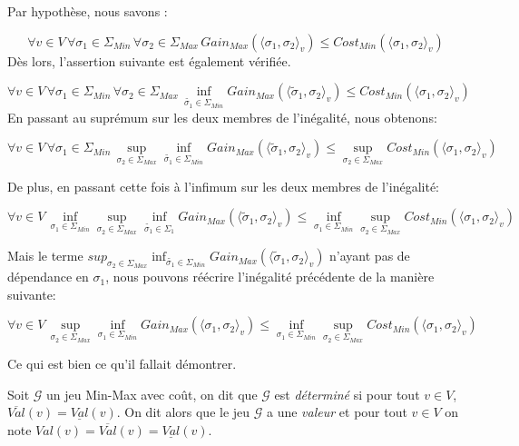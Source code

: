 \begin{demonstration}
	Par hypothèse, nous savons : 
	
	$$ \forall v \in V \, \forall \sigma_{1} \in \Sigma_{Min} \, \forall \sigma_{2} \in \Sigma_{Max}\, Gain_{Max}(\langle \sigma_1, \sigma_2 \rangle_v) \leq Cost_{Min}(\langle \sigma_1, \sigma_2 \rangle_v)$$
	Dès lors, l'assertion suivante est également vérifiée.
	
	
	$$ \forall v \in V \, \forall \sigma_{1} \in \Sigma_{Min} \, \forall \sigma_{2}\in \Sigma_{Max}\, \inf_{\tilde{\sigma_1} \in \Sigma_{Min}}Gain_{Max}(\langle \tilde{\sigma}_1, \sigma_2 \rangle_v) \leq Cost_{Min}(\langle \sigma_1, \sigma_2 \rangle_v)$$
	En passant au suprémum sur les deux membres de l'inégalité, nous obtenons:
	
	$$ \forall v \in V \, \forall \sigma_1 \in \Sigma_{Min} \,\sup_{\sigma_2 \in \Sigma_{Max}}\inf_{\tilde{\sigma_1} \in \Sigma_{Min}}Gain_{Max}(\langle \tilde{\sigma}_1, \sigma_2 \rangle_v) \leq \sup_{\sigma_2 \in \Sigma_{Max}}Cost_{Min}(\langle \sigma_1, \sigma_2 \rangle_v)$$
	
	De plus, en passant cette fois à l'infimum sur les deux membres de l'inégalité:
	
		$$ \forall v \in V \, \inf_{\sigma_1 \in \Sigma_{Min}}\sup_{\sigma_2 \in \Sigma_{Max}}\inf_{\tilde{\sigma_1} \in \Sigma_1}Gain_{Max}(\langle \tilde{\sigma}_1, \sigma_2 \rangle_v) \leq \inf_{\sigma_1 \in \Sigma_{Min}}\sup_{\sigma_2 \in \Sigma_{Max}}Cost_{Min}(\langle \sigma_1, \sigma_2 \rangle_v)$$
		
		Mais le terme $sup_{\sigma_2 \in \Sigma_{Max}}\inf_{\tilde{\sigma_1} \in \Sigma_{Min}}Gain_{Max}(\langle \tilde{\sigma}_1, \sigma_2 \rangle_v)$ n'ayant pas de dépendance en $\sigma_1$, nous pouvons réécrire l'inégalité précédente de la manière suivante:
		
		$$ \forall v \in V \,\sup_{\sigma_2 \in \Sigma_{Max}}\inf_{\sigma_1 \in \Sigma_{Min}}Gain_{Max}(\langle \sigma_1, \sigma_2 \rangle_v) \leq \inf_{\sigma_1 \in \Sigma_{Min}}\sup_{\sigma_2 \in \Sigma_{Max}}Cost_{Min}(\langle \sigma_1, \sigma_2 \rangle_v)$$
		
		Ce qui est bien ce qu'il fallait démontrer.
\end{demonstration}

\setlength{\overfullrule}{10pt}


\begin{defi}
		Soit $\mathcal{G}$ un jeu Min-Max avec coût, on dit que $\mathcal{G}$ est \textit{déterminé} si pour tout $v \in V$, $\overline{Val}(v) = \underline{Val}(v)$. On dit alors que le jeu $\mathcal{G}$ a une \textit{valeur} et pour tout $v \in V$ on note $Val(v) = \overline{Val}(v) = \underline{Val}(v)$.
\end{defi}

